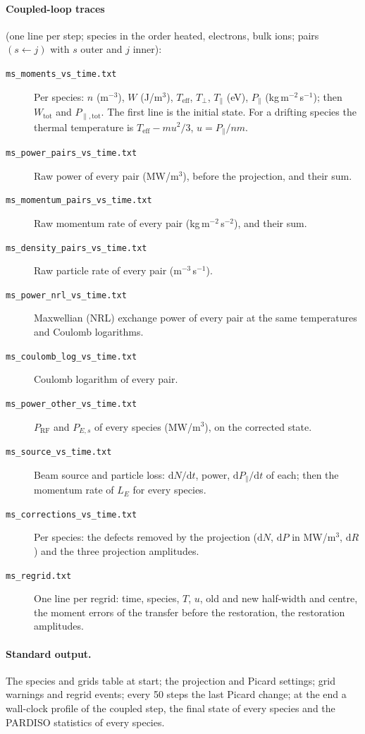 \documentclass[11pt,a4paper]{article}
\begin{document}
\paragraph{Coupled-loop traces} (one line per step; species in the order heated, electrons, bulk ions;
pairs $(s\leftarrow j)$ with $s$ outer and $j$ inner):
\begin{description}
\item[\texttt{ms\_moments\_vs\_time.txt}] Per species: $n$ (m$^{-3}$), $W$ (J/m$^3$),
  $T_\mathrm{eff}$, $T_\perp$, $T_\parallel$ (eV), $P_\parallel$ (kg\,m$^{-2}$\,s$^{-1}$); then $W_\mathrm{tot}$ and
  $P_{\parallel,\mathrm{tot}}$.  The first line is the initial state.  For a drifting species the
  thermal temperature is $T_\mathrm{eff}-mu^2/3$, $u=P_\parallel/nm$.
\item[\texttt{ms\_power\_pairs\_vs\_time.txt}] Raw power of every pair (MW/m$^3$), before the
  projection, and their sum.
\item[\texttt{ms\_momentum\_pairs\_vs\_time.txt}] Raw momentum rate of every pair
  (kg\,m$^{-2}$\,s$^{-2}$), and their sum.
\item[\texttt{ms\_density\_pairs\_vs\_time.txt}] Raw particle rate of every pair
  (m$^{-3}$\,s$^{-1}$).
\item[\texttt{ms\_power\_nrl\_vs\_time.txt}] Maxwellian (NRL) exchange power of every pair at the same
  temperatures and Coulomb logarithms.
\item[\texttt{ms\_coulomb\_log\_vs\_time.txt}] Coulomb logarithm of every pair.
\item[\texttt{ms\_power\_other\_vs\_time.txt}] $P_\mathrm{RF}$ and $P_{E,s}$ of every species (MW/m$^3$),
  on the corrected state.
\item[\texttt{ms\_source\_vs\_time.txt}] Beam source and particle loss: $\mathrm dN/\mathrm dt$,
  power, $\mathrm dP_\parallel/\mathrm dt$ of each; then the momentum rate of $L_E$ for every species.
\item[\texttt{ms\_corrections\_vs\_time.txt}] Per species: the defects removed by the projection
  ($\mathrm dN$, $\mathrm dP$ in MW/m$^3$, $\mathrm dR$) and the three projection amplitudes.
\item[\texttt{ms\_regrid.txt}] One line per regrid: time, species, $T$, $u$, old and new half-width and
  centre, the moment errors of the transfer before the restoration, the restoration amplitudes.
\end{description}

\paragraph{Standard output.}  The species and grids table at start; the projection and Picard
settings; grid warnings and regrid events; every 50 steps the last Picard change; at the end a
wall-clock profile of the coupled step, the final state of every species and the PARDISO statistics
of every species.
\end{document}
